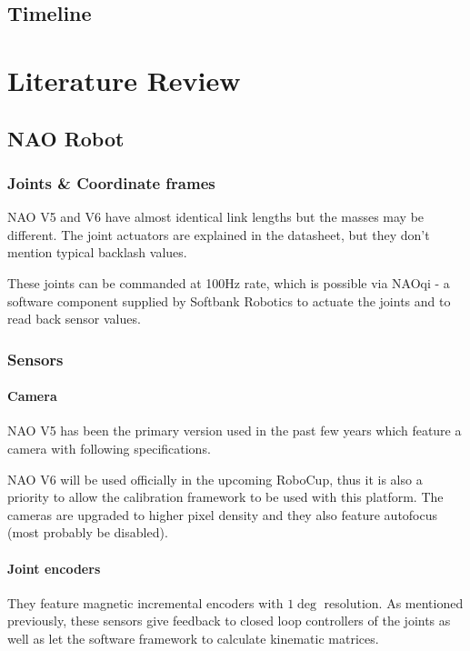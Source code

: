 \documentclass[english, printversion, nomenclature, notitle]{tuvisionthesis} %
\begin{document}
\section{Timeline}

\chapter{Literature Review}

\section{NAO Robot}

\subsection{Joints \& Coordinate frames}
NAO V5 and V6 have almost identical link lengths but the masses may be different. The joint actuators are explained in the datasheet, but they don't mention typical backlash values. 

These joints can be commanded at 100Hz rate, which is possible via NAOqi - a software component supplied by Softbank Robotics to actuate the joints and to read back sensor values.

\subsection{Sensors}
\subsubsection{Camera}
NAO V5 has been the primary version used in the past few years which feature a camera with following specifications.

NAO V6 will be used officially in the upcoming RoboCup, thus it is also a priority to allow the calibration framework to be used with this platform. The cameras are upgraded to higher pixel density and they also feature autofocus (most probably be disabled).

\subsubsection{Joint encoders}
They feature magnetic incremental encoders with $1\deg$ resolution. As mentioned previously, these sensors give feedback to closed loop controllers of the joints as well as let the software framework to calculate kinematic matrices.
\end{document}
